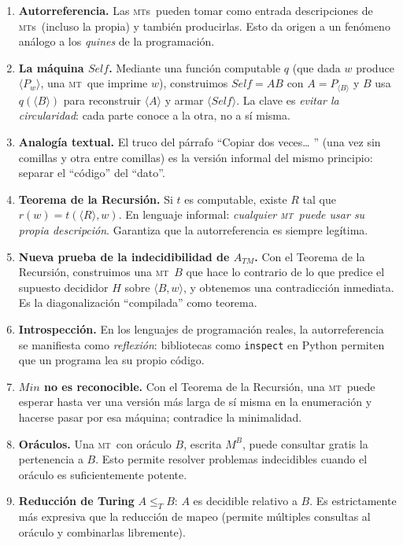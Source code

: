 \documentclass[11pt,a4paper]{article}
\theoremstyle{definicion}
\newcommand{\MT}{\textsc{mt}}
\newcommand{\MTs}{\textsc{mt}s}
\newcommand{\enc}[1]{\langle #1 \rangle}
\begin{document}
\begin{enumerate}
    \item \textbf{Autorreferencia.} Las \MTs\ pueden tomar como entrada descripciones de \MTs\ (incluso la propia) y también producirlas. Esto da origen a un fenómeno análogo a los \emph{quines} de la programación.

    \item \textbf{La máquina $\mathit{Self}$.} Mediante una función computable $q$ (que dada $w$ produce $\enc{P_w}$, una \MT\ que imprime $w$), construimos $\mathit{Self} = AB$ con $A = P_{\enc{B}}$ y $B$ usa $q(\enc{B})$ para reconstruir $\enc{A}$ y armar $\enc{\mathit{Self}}$. La clave es \emph{evitar la circularidad}: cada parte conoce a la otra, no a sí misma.

    \item \textbf{Analogía textual.} El truco del párrafo ``Copiar dos veces… '' (una vez sin comillas y otra entre comillas) es la versión informal del mismo principio: separar el ``código'' del ``dato''.

    \item \textbf{Teorema de la Recursión.} Si $t$ es computable, existe $R$ tal que $r(w) = t(\enc{R}, w)$. En lenguaje informal: \emph{cualquier \MT\ puede usar su propia descripción}. Garantiza que la autorreferencia es siempre legítima.

    \item \textbf{Nueva prueba de la indecidibilidad de $A_{TM}$.} Con el Teorema de la Recursión, construimos una \MT\ $B$ que hace lo contrario de lo que predice el supuesto decididor $H$ sobre $\enc{B, w}$, y obtenemos una contradicción inmediata. Es la diagonalización ``compilada'' como teorema.

    \item \textbf{Introspección.} En los lenguajes de programación reales, la autorreferencia se manifiesta como \emph{reflexión}: bibliotecas como \texttt{inspect} en Python permiten que un programa lea su propio código.

    \item \textbf{$\mathit{Min}$ no es reconocible.} Con el Teorema de la Recursión, una \MT\ puede esperar hasta ver una versión más larga de sí misma en la enumeración y hacerse pasar por esa máquina; contradice la minimalidad.

    \item \textbf{Oráculos.} Una \MT\ con oráculo $B$, escrita $M^B$, puede consultar gratis la pertenencia a $B$. Esto permite resolver problemas indecidibles cuando el oráculo es suficientemente potente.

    \item \textbf{Reducción de Turing} $A \leq_T B$: $A$ es decidible relativo a $B$. Es estrictamente más expresiva que la reducción de mapeo (permite múltiples consultas al oráculo y combinarlas libremente).
\end{enumerate}
\end{document}
